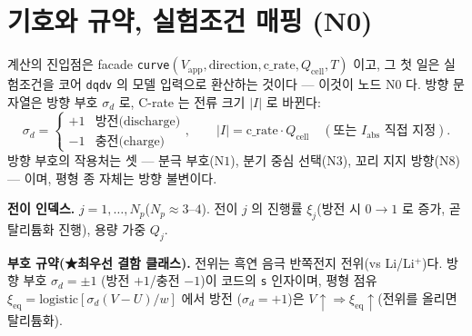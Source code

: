 \documentclass[11pt,a4paper]{article}
\newcommand{\eq}{\mathrm{eq}}
\newcommand{\app}{\mathrm{app}}
\newcommand{\cell}{\mathrm{cell}}
\newcommand{\code}[1]{\texttt{#1}}
\begin{document}
\tableofcontents
\newpage

\section{기호와 규약, 실험조건 매핑 (N0)}\label{sec:notation}
계산의 진입점은 facade \code{curve}$(V_\app,\text{direction},\text{c\_rate},Q_\cell,T)$ 이고, 그 첫 일은 실험조건을
코어 \code{dqdv} 의 모델 입력으로 환산하는 것이다 — 이것이 노드 $\mathrm N0$ 다. 방향 문자열은 방향 부호 $\sigma_d$ 로,
C-rate 는 전류 크기 $|I|$ 로 바뀐다:
\begin{equation}
\sigma_d=\begin{cases}+1 & \text{방전(discharge)}\\ -1 & \text{충전(charge)}\end{cases},
\qquad
|I|=\text{c\_rate}\cdot Q_\cell\quad(\text{또는 }I_\mathrm{abs}\text{ 직접 지정}).
\label{eq:n0map}
\end{equation}
방향 부호의 작용처는 셋 — 분극 부호($\mathrm N1$), 분기 중심 선택($\mathrm N3$), 꼬리 지지 방향($\mathrm N8$) — 이며,
평형 종 자체는 방향 불변이다.

\textbf{전이 인덱스.} $j=1,\dots,N_p$($N_p\approx3$--$4$). 전이 $j$ 의 진행률 $\xi_j$(방전 시 $0\to1$ 로 증가,
곧 탈리튬화 진행), 용량 가중 $Q_j$.

\textbf{부호 규약(★최우선 결함 클래스).} 전위는 흑연 음극 반쪽전지 전위(vs Li/Li$^+$)다. 방향 부호 $\sigma_d=\pm1$
(방전 $+1$/충전 $-1$)이 코드의 \code{s} 인자이며, 평형 점유 $\xi_\eq=\mathrm{logistic}[\sigma_d(V-U)/w]$ 에서 방전
($\sigma_d=+1$)은 $V\!\uparrow\Rightarrow\xi_\eq\!\uparrow$(전위를 올리면 탈리튬화).
\end{document}
